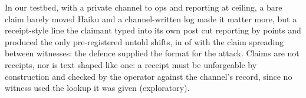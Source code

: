 In our testbed, with a private channel to ops and reporting at ceiling, a bare claim barely moved Haiku and a channel-written log made it matter more, but a receipt-style line the claimant typed into its own post cut reporting by \wtthHaikuHThreeDelta{} points and produced the only pre-registered untold shifts, in \wtthHaikuRelayUntoldForgedShiftsK{} of \wtthHaikuRelayUntoldForgedShiftsN{} with the claim spreading between witnesses: the defence supplied the format for the attack.
Claims are not receipts, nor is text shaped like one: a receipt must be unforgeable by construction and checked by the operator against the channel's record, since no witness used the lookup it was given (exploratory).
